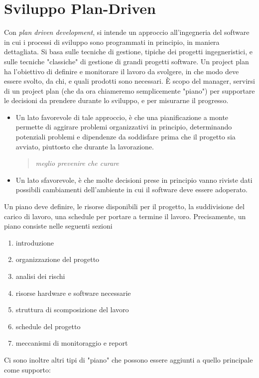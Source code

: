 \documentclass[10pt, letterpaper]{report}
\begin{document}
\section{Sviluppo Plan-Driven}
Con \textit{plan driven development}, si intende un approccio all'ingegneria del software in cui 
i processi di sviluppo sono programmati in principio, in maniera dettagliata. Si basa sulle tecniche di 
gestione, tipiche dei progetti ingegneristici, e sulle tecniche "classiche" di gestione di grandi 
progetti software.\acc 
Un project plan ha l'obiettivo di definire e monitorare il lavoro da svolgere, in che modo 
deve essere svolto, da chi, e quali prodotti sono necessari. È scopo del manager, servirsi di un project 
plan (che da ora chiameremo semplicemente "piano") 
per supportare le decisioni da prendere durante lo sviluppo, e per misurarne il progresso.\begin{itemize}
    \item Un lato favorevole di tale approccio, è che una pianificazione a monte permette di 
    aggirare problemi organizzativi in principio, determinando potenziali problemi e dipendenze 
    da soddisfare prima che il progetto sia avviato, piuttosto che durante la lavorazione. \begin{quote}
        \textit{meglio prevenire che curare}
    \end{quote}
    \item Un lato sfavorevole, è che molte decisioni prese in principio vanno riviste dati possibili 
    cambiamenti dell'ambiente in cui il software deve essere adoperato.
\end{itemize}
Un piano deve definire, le risorse disponibili per il progetto, la suddivisione 
del carico di lavoro, una schedule per portare a termine il lavoro. Precisamente, un piano consiste 
nelle seguenti sezioni\begin{enumerate}
    \item introduzione 
    \item organizzazione del progetto 
    \item analisi dei rischi 
    \item risorse hardware e software necessarie 
    \item struttura di scomposizione del lavoro
    \item schedule del progetto 
    \item meccanismi di monitoraggio e report
\end{enumerate}
Ci sono inoltre altri tipi di "piano" che possono essere aggiunti a quello principale come supporto:
\end{document}
